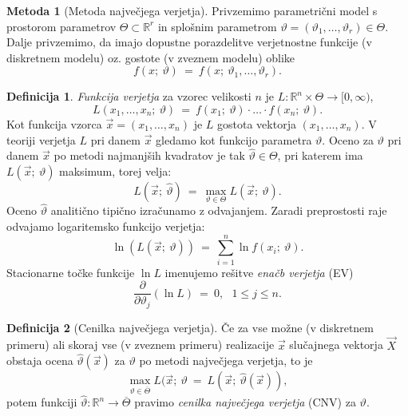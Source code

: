 \documentclass[11pt]{article}
\newcommand{\R}{\mathbb{R}}
\newcommand{\1}{\mathbbm{1}}
\theoremstyle{definition}
\newtheorem{definicija}{Definicija}[section]
\theoremstyle{definition}
\theoremstyle{definition}
\newtheorem{metoda}{Metoda}
\begin{document}
\begin{metoda}[Metoda največjega verjetja]

Privzemimo parametrični model s prostorom parametrov $\Theta \subset \R^r$ in splošnim parametrom \hbox{$\vartheta = (\vartheta_1, \ldots, \vartheta_r) \in \Theta$}. Dalje privzemimo, da imajo dopustne porazdelitve verjetnostne funkcije (v diskretnem modelu) oz. gostote (v zveznem modelu) oblike
$$f(x;~\vartheta) ~=~ f(x;~\vartheta_1, \ldots, \vartheta_r).$$

\end{metoda}
\vspace{0.5cm}

\begin{definicija}

\textit{Funkcija verjetja} za vzorec velikosti $n$ je \hbox{$L: \R^n \times \Theta \rightarrow [0, \infty)$},
$$L(x_1, \ldots, x_n;~\vartheta) ~=~ f(x_1;~\vartheta) \cdot \ldots \cdot f(x_n;~\vartheta).$$
Kot funkcija vzorca $\vec{x} = (x_1, \ldots, x_n)$ je $L$ gostota vektorja $(x_1, \ldots, x_n)$. V teoriji verjetja $L$ pri danem $\vec{x}$ gledamo kot funkcijo parametra $\vartheta$. Oceno za $\vartheta$ pri danem $\vec{x}$ po metodi najmanjših kvadratov je tak $\hat{\vartheta} \in \Theta$, pri katerem ima $L(\vec{x};~\vartheta)$ maksimum, torej velja:
$$L(\vec{x};~\hat{\vartheta}) ~=~ \max_{\vartheta \in \Theta}{L(\vec{x};~\vartheta)}.$$
Oceno $\hat{\vartheta}$ analitično tipično izračunamo z odvajanjem. Zaradi preprostosti raje odvajamo logaritemsko funkcijo verjetja:
$$\ln(L(\vec{x};~\vartheta)) ~=~ \sum_{i=1}^n \ln{f(x_i;~\vartheta)}.$$
Stacionarne točke funkcije $\ln L$ imenujemo rešitve \textit{enačb verjetja} (EV)
$$\frac{\partial}{\partial \vartheta_j} (\ln L) ~=~ 0, ~~~1 \leq j \leq n.$$

\end{definicija}
\vspace{0.5cm}

\begin{definicija}[Cenilka največjega verjetja]

Če za vse možne (v diskretnem primeru) ali skoraj vse (v zveznem primeru) realizacije $\vec{x}$ slučajnega vektorja $\vec{X}$ obstaja ocena $\hat{\vartheta}(\vec{x})$ za $\vartheta$ po metodi največjega verjetja, to je
$$\max_{\vartheta \in \overline{\Theta}}{L(\vec{x};~\vartheta} ~=~ L(\vec{x};~\hat{\vartheta}(\vec{x})),$$
potem funkciji $\hat{\vartheta}: \R^n \rightarrow \overline{\Theta}$ pravimo \textit{cenilka največjega verjetja} (CNV) za $\vartheta$.

\end{definicija}
\vspace{0.5cm}
\end{document}
